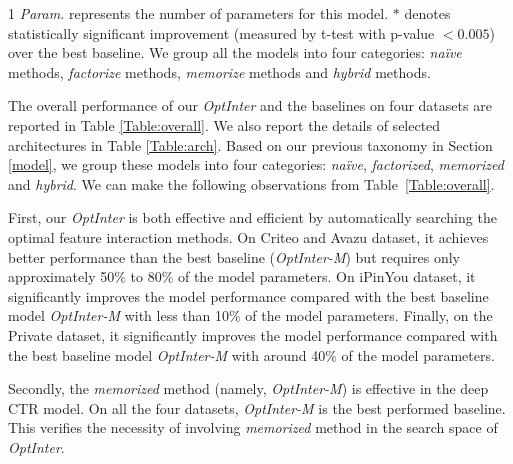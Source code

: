 \documentclass[conference]{IEEEtran}
\begin{document}
\begin{table*}[!htbp]
{\begin{tabular}{c|ccc|ccc|ccc|ccc}
		\hline
	\end{tabular}

	\begin{tablenotes}
    \footnotesize
    \item[1] \textit{Param.} represents the number of parameters for this model. $*$ denotes statistically significant improvement (measured by t-test with p-value $<0.005$) over the best baseline. We group all the models into four categories: \emph{naïve} methods, \emph{factorize} methods, \emph{memorize} methods and \emph{hybrid} methods.
    \end{tablenotes}
}
\end{table*}


The overall performance of our \textit{OptInter} and the baselines on four datasets are reported in Table \ref{Table:overall}. We also report the details of selected architectures in Table \ref{Table:arch}. Based on our previous taxonomy in Section \ref{model}, we group these models into four categories: \emph{naïve}, \emph{factorized}, \emph{memorized} and \emph{hybrid}. We can make the following observations from Table~\ref{Table:overall}.

First, our \textit{OptInter} is both effective and efficient by automatically searching the optimal feature interaction methods. On Criteo and Avazu dataset, it achieves better performance than the best baseline (\textit{OptInter-M}) but requires only approximately 50\% to 80\% of the model parameters. On iPinYou dataset, it significantly improves the model performance compared with the best baseline model \textit{OptInter-M} with less than 10\% of the model parameters. Finally, on the Private dataset, it significantly improves the model performance compared with the best baseline model \textit{OptInter-M} with around 40\% of the model parameters. 

Secondly, the \emph{memorized} method (namely, \textit{OptInter-M}) is effective in the deep CTR model. On all the four datasets, \textit{OptInter-M} is the best performed baseline.
This verifies the necessity of involving \emph{memorized} method in the search space of \textit{OptInter}.
\end{document}

